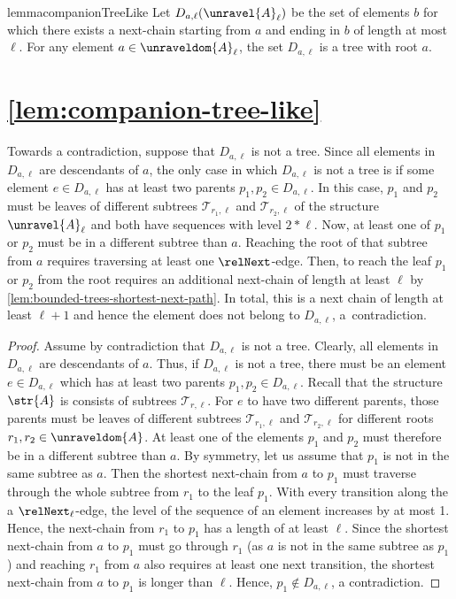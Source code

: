 \ifmainpart
\begin{restatable}{lemma}{companionTreeLike}\label{lem:companion-tree-like}
  Let $D_{a, \ell}(\unravel{A}_{\ell})$ be the set of elements $b$ for which there exists a next-chain starting from $a$ and ending in $b$ of length at most $\ell$.
  For any element $a \in \unraveldom{A}_{\ell}$, the set $D_{a, \ell}$ is a tree with root $a$.
\end{restatable}
\else
  \section{\cref{lem:companion-tree-like}}
  \companionTreeLike*
\fi
\ifmainpart
\begin{proofsketch}
  Towards a contradiction, suppose that $D_{a,\ell}$ is not a tree. Since all elements in $D_{a,\ell}$ are descendants of $a$, the only case in which $D_{a,\ell}$ is not a tree is if some element $e \in D_{a,\ell}$ has at least two parents $p_{1}, p_{2} \in D_{a,\ell}$.
  In this case, $p_{1}$ and $p_{2}$ must be leaves of different subtrees $\mathcal{T}_{r_{1},\ell}$ and $\mathcal{T}_{r_{2},\ell}$ of the structure $\unravel{A}_{\ell}$ and both have sequences with level $2 * \ell$.
  Now, at least one of $p_{1}$ or $p_{2}$ must be in a different subtree than $a$.
  Reaching the root of that subtree from $a$ requires traversing at least one $\relNext$-edge.
  Then, to reach the leaf $p_{1}$ or $p_{2}$ from the root requires an additional next-chain of length at least $\ell$ by \cref{lem:bounded-trees-shortest-next-path}.
  In total, this is a next chain of length at least $\ell + 1$ and hence the element does not belong to $D_{a,\ell}$, a~contradiction.
\end{proofsketch}
\else
\begin{proof}
  Assume by contradiction that $D_{a,\ell}$ is not a tree.
  Clearly, all elements in $D_{a,\ell}$ are descendants of $a$.
  Thus, if $D_{a,\ell}$ is not a tree, there must be an element $e \in D_{a,\ell}$ which has at least two parents $p_{1}, p_{2} \in D_{a,\ell}$.
  Recall that the structure $\str{A}$ is consists of subtrees $\mathcal{T}_{r,\ell}$.
  For $e$ to have two different parents, those parents must be leaves of different subtrees $\mathcal{T}_{r_{1},\ell}$ and $\mathcal{T}_{r_{2}, \ell}$ for different roots $r_{1}, r_{2} \in \unraveldom{A}$.
  At least one of the elements $p_{1}$ and $p_{2}$ must therefore be in a different subtree than $a$.
  By symmetry, let us assume that $p_{1}$ is not in the same subtree as $a$.
  Then the shortest next-chain from $a$ to $p_{1}$ must traverse through the whole subtree from $r_{1}$ to the leaf $p_{1}$.
  With every transition along the a $\relNext_{\ell}$-edge, the level of the sequence of an element increases by at most 1.
  Hence, the next-chain from $r_{1}$ to $p_{1}$ has a length of at least $\ell$.
  Since the shortest next-chain from $a$ to $p_{1}$ must go through $r_{1}$ (as $a$ is not in the same subtree as $p_{1}$) and reaching $r_{1}$ from $a$ also requires at least one next transition, the shortest next-chain from $a$ to $p_{1}$ is longer than $\ell$.
  Hence, $p_{1} \notin D_{a,\ell}$, a contradiction.
\end{proof}
\fi

